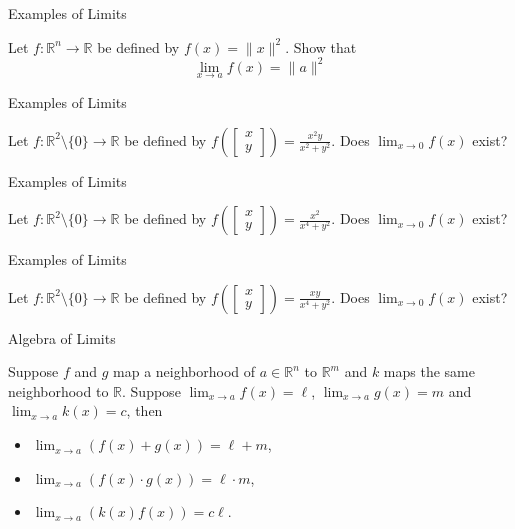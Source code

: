 \documentclass[12pt, a4paper]{article}
\begin{document}
    \clearpage
    \begin{heading}
        Examples of Limits
    \end{heading}
    \begin{problem}
        Let $f:\mathbb R^n\rightarrow\mathbb R$ be defined by $f(x)=\|x\|^2$. Show that $$\lim_{x\to a} f(x)=\|a\|^2$$
    \end{problem}
    \clearpage
    \begin{heading}
        Examples of Limits
    \end{heading}
    \begin{problem}
        Let $f:\mathbb R^2\setminus\{0\}\rightarrow\mathbb R$ be defined by $f\left(\begin{bmatrix}
            x\\y
        \end{bmatrix}\right)=\frac{x^2y}{x^2+y^2}$. Does $\lim_{x\to 0} f(x)$ exist?
    \end{problem}   
    \clearpage
    \begin{heading}
        Examples of Limits
    \end{heading}
    \begin{problem}
        Let $f:\mathbb R^2\setminus\{0\}\rightarrow\mathbb R$ be defined by $f\left(\begin{bmatrix}
            x\\y
        \end{bmatrix}\right)=\frac{x^2}{x^4+y^2}$. Does $\lim_{x\to 0} f(x)$ exist?
    \end{problem} 
    \clearpage
    \begin{heading}
        Examples of Limits
    \end{heading}    
    \begin{problem}
        Let $f:\mathbb R^2\setminus\{0\}\rightarrow\mathbb R$ be defined by $f\left(\begin{bmatrix}
            x\\y
        \end{bmatrix}\right)=\frac{xy}{x^4+y^2}$. Does $\lim_{x\to 0} f(x)$ exist?
    \end{problem} 
    \clearpage
    \begin{heading}
        Algebra of Limits
    \end{heading}
    \begin{theorem}
        Suppose $f$ and $g$ map a neighborhood of $a\in\mathbb{R}^n$ to $\mathbb{R}^m$ and $k$ maps the same neighborhood to $\mathbb{R}$. Suppose $\lim_{x\to a} f(x)=\ell$, $\lim_{x\to a} g(x)=m$ and $\lim_{x\to a} k(x)=c$, then
        \begin{itemize}
            \item $\lim_{x\to a} (f(x)+g(x))=\ell+m$,
            \item $\lim_{x\to a} (f(x)\cdot g(x))=\ell\cdot m$,
            \item $\lim_{x\to a} (k(x)f(x))=c\ell$.
        \end{itemize}
    \end{theorem}
\end{document}

